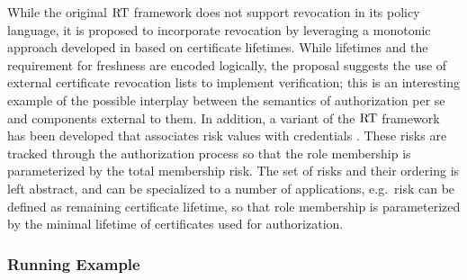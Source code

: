 While the original $\text{RT}$ framework does not support revocation in its
policy language, it is proposed to incorporate revocation
\cite{Li:DRBTMF} by leveraging a monotonic approach developed in
\cite{lbi-fc01} based on certificate lifetimes.  While lifetimes and
the requirement for freshness are encoded logically, the proposal
suggests the use of external certificate revocation lists to implement
verification; this is an interesting example of the possible interplay
between the semantics of authorization per se and components external
to them.  In addition, a variant of the $\text{RT}$ framework has been
developed that associates risk values with credentials
\cite{skalka-wang-chapin-jcs06}. These risks are tracked 
through the authorization process so that the role membership is
parameterized by the total membership risk.  The set of risks and
their ordering is left abstract, and can be specialized to a number of
applications, e.g.~risk can be defined as remaining certificate
lifetime, so that role membership is parameterized by the minimal
lifetime of certificates used for authorization.

%

\subsubsection{Running Example}

